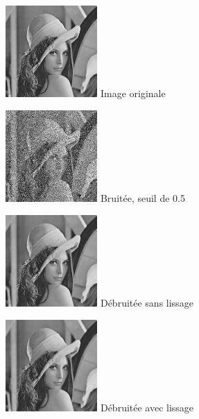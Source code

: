 \documentclass{article}
\begin{document}
		\begin{figure}[!ht]
			\centering
			\begin{minipage}[t]{3.5cm}
				\centering
				\includegraphics[width=3.5cm,height=3.5cm]{lena.jpg}
				Image originale
			\end{minipage}
			\begin{minipage}[t]{3.5cm}
				\centering
				\includegraphics[width=3.5cm,height=3.5cm]{SaltAndPepper/50.jpg}
				Bruitée, seuil de 0.5
			\end{minipage}
			\begin{minipage}[t]{3.5cm}
				\centering
				\includegraphics[width=3.5cm,height=3.5cm]{SaltAndPepper/unset_50.jpg}
				Débruitée sans lissage
			\end{minipage}
			\begin{minipage}[t]{3.5cm}
				\centering
				\includegraphics[width=3.5cm,height=3.5cm]{SaltAndPepper/unset_50_liss.jpg}
				Débruitée avec lissage
			\end{minipage}
		\end{figure}
		
\end{document}
